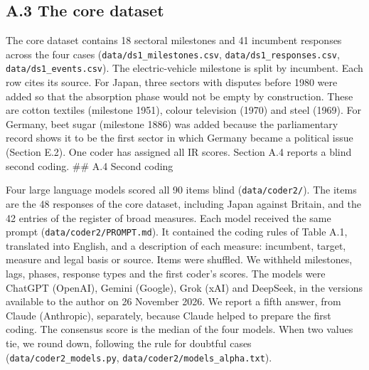 \hypertarget{a.3-the-core-dataset}{%
\subsection*{A.3 The core dataset}\label{a.3-the-core-dataset}}

The core dataset contains 18 sectoral milestones and 41 incumbent
responses across the four cases (\texttt{data/\allowbreak{}ds1\_\allowbreak{}milestones.csv},
\texttt{data/\allowbreak{}ds1\_\allowbreak{}responses.csv}, \texttt{data/\allowbreak{}ds1\_\allowbreak{}events.csv}). The
electric-vehicle milestone is split by incumbent. Each row cites its
source. For Japan, three sectors with disputes before 1980 were added so
that the absorption phase would not be empty by construction. These are
cotton textiles (milestone 1951), colour television (1970) and steel
(1969). For Germany, beet sugar (milestone 1886) was added because the
parliamentary record shows it to be the first sector in which Germany
became a political issue (Section E.2). One coder has assigned all IR
scores. Section A.4 reports a blind second coding. \#\# A.4 Second
coding

Four large language models scored all 90 items blind
(\texttt{data/\allowbreak{}coder2/\allowbreak{}}). The items are the 48 responses of the core
dataset, including Japan against Britain, and the 42 entries of the
register of broad measures. Each model received the same prompt
(\texttt{data/\allowbreak{}coder2/\allowbreak{}PROMPT.md}). It contained the coding rules of Table
A.1, translated into English, and a description of each measure:
incumbent, target, measure and legal basis or source. Items were
shuffled. We withheld milestones, lags, phases, response types and the
first coder's scores. The models were ChatGPT (OpenAI), Gemini (Google),
Grok (xAI) and DeepSeek, in the versions available to the author on 26
November 2026. We report a fifth answer, from Claude (Anthropic),
separately, because Claude helped to prepare the first coding. The
consensus score is the median of the four models. When two values tie,
we round down, following the rule for doubtful cases
(\texttt{data/\allowbreak{}coder2\_\allowbreak{}models.py},
\texttt{data/\allowbreak{}coder2/\allowbreak{}models\_\allowbreak{}alpha.txt}).

